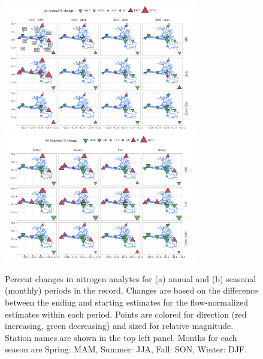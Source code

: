 \documentclass[letterpaper,12pt,oneside]{article}\usepackage[]{graphicx}\usepackage[]{color}
\begin{document}
\begin{figure}[!ht]

{\centering \includegraphics[width=0.75\textwidth]{figs/trndmap-1} 
\includegraphics[width=0.75\textwidth]{figs/trndmap-2} 

}

\caption[Percent changes in nitrogen analytes for (a) annual and (b) seasonal (monthly) periods in the record]{Percent changes in nitrogen analytes for (a) annual and (b) seasonal (monthly) periods in the record.  Changes are based on the difference between the ending and starting estimates for the flow-normalized estimates within each period.  Points are colored for direction (red increasing, green decreasing) and sized for relative magnitude. Station names are shown in the top left panel. Months for each season are Spring: MAM, Summer: JJA, Fall: SON, Winter: DJF.}\label{fig:trndmap}
\end{figure}
\end{document}
